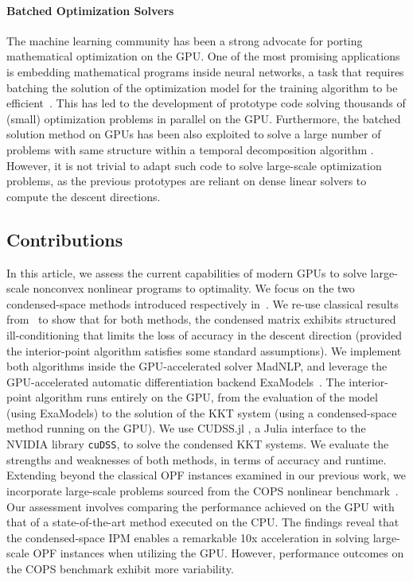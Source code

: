 \paragraph{Batched Optimization Solvers}
The machine learning community has been a strong advocate for porting
mathematical optimization on the GPU. One of the most promising
applications is embedding mathematical programs inside neural networks,
a task that requires batching the solution of the optimization model
for the training algorithm to be
efficient~\cite{amos2017optnet,pineda2022theseus}.  This has led to
the development of prototype code solving thousands of (small)
optimization problems in parallel on the GPU.
Furthermore, the batched solution method on GPUs has been also exploited to
solve a large number of problems with same structure within a temporal
decomposition algorithm \cite{kimLeveragingGPUBatching2021}.
However, it is not
trivial to adapt such code to solve large-scale optimization problems,
as the previous prototypes are reliant on dense linear solvers to
compute the descent directions.


\subsection{Contributions}
In this article, we assess the current capabilities of modern GPUs
to solve large-scale nonconvex nonlinear programs to optimality.
We focus on the two condensed-space methods
introduced respectively in~\cite{regev2023hykkt,shin2023accelerating}.
We re-use classical results from~\cite{wright1998ill} to show
that for both methods, the condensed matrix exhibits
structured ill-conditioning that limits the loss of accuracy in
the descent direction (provided the interior-point algorithm satisfies
some standard assumptions).
We implement both algorithms inside the GPU-accelerated solver MadNLP,
and leverage the GPU-accelerated automatic differentiation
backend ExaModels~\cite{shin2023accelerating}.
The interior-point algorithm runs entirely on the GPU, from
the evaluation of the model (using ExaModels) to the solution of
the KKT system (using a condensed-space method running on the GPU).
We use CUDSS.jl \cite{Montoison_CUDSS}, a Julia interface to the NVIDIA library {\tt cuDSS},
to solve the condensed KKT systems. We evaluate the strengths
and weaknesses of both methods, in terms of accuracy and runtime.
Extending beyond the classical OPF instances examined in our previous work, we incorporate large-scale problems sourced from the COPS nonlinear benchmark~\cite{dolan2004benchmarking}.
Our assessment involves comparing the performance achieved on the GPU with that of a state-of-the-art method executed on the CPU.
The findings reveal that the condensed-space IPM enables a remarkable 10x acceleration in solving large-scale OPF instances when utilizing the GPU.
However, performance outcomes on the COPS benchmark exhibit more variability.

